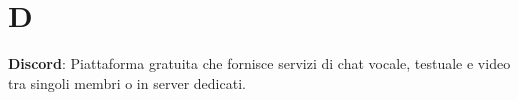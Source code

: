 \section{D}
\textbf{Discord}: Piattaforma gratuita che fornisce servizi di chat vocale, testuale e video tra singoli membri o in server dedicati.